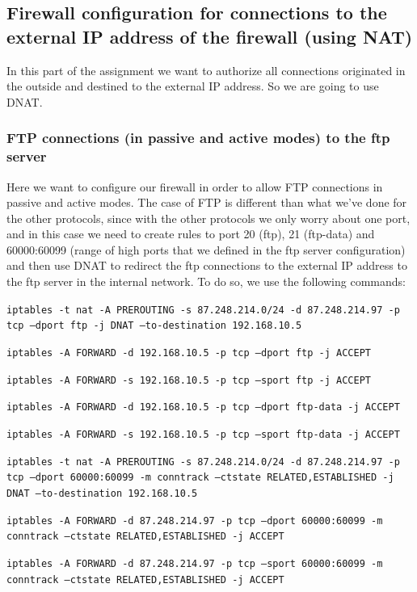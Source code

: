 \documentclass{article}
\begin{document}
\subsection{Firewall configuration for connections to the external IP address of the firewall (using NAT)}
\quad In this part of the assignment we want to authorize all connections originated in the outside and destined to the external IP address. So we are going to use DNAT.


\subsubsection{FTP connections (in passive and active modes) to the ftp server}
\quad Here we want to configure our firewall in order to allow FTP connections in passive and active modes. The case of FTP is different than what we've done for the other protocols, since with the other protocols we only worry about one port, and in this case we need to create rules to port 20 (ftp), 21 (ftp-data) and 60000:60099 (range of high ports that we defined in the ftp server configuration) and then use DNAT to redirect the ftp connections to the external IP address to the ftp server in the internal network. To do so, we use the following commands:

\texttt{}\par
\texttt{iptables -t nat -A PREROUTING -s 87.248.214.0/24 -d 87.248.214.97 -p tcp --dport ftp -j DNAT --to-destination 192.168.10.5}\par
\texttt{iptables -A FORWARD -d 192.168.10.5 -p tcp --dport ftp -j ACCEPT}\par
\texttt{iptables -A FORWARD -s 192.168.10.5 -p tcp --sport ftp -j ACCEPT}\par
\texttt{iptables -A FORWARD -d 192.168.10.5 -p tcp --dport ftp-data -j ACCEPT}\par
\texttt{iptables -A FORWARD -s 192.168.10.5 -p tcp --sport ftp-data -j ACCEPT}\par
\texttt{iptables -t nat -A PREROUTING -s 87.248.214.0/24 -d 87.248.214.97 -p tcp --dport 60000:60099 -m conntrack --ctstate RELATED,ESTABLISHED -j DNAT --to-destination 192.168.10.5
}\par
\texttt{iptables -A FORWARD -d 87.248.214.97 -p tcp --dport 60000:60099 -m conntrack --ctstate RELATED,ESTABLISHED -j ACCEPT
}\par
\texttt{iptables -A FORWARD -d 87.248.214.97 -p tcp --sport 60000:60099 -m conntrack --ctstate RELATED,ESTABLISHED -j ACCEPT
}\par
\texttt{}\par
\end{document}
